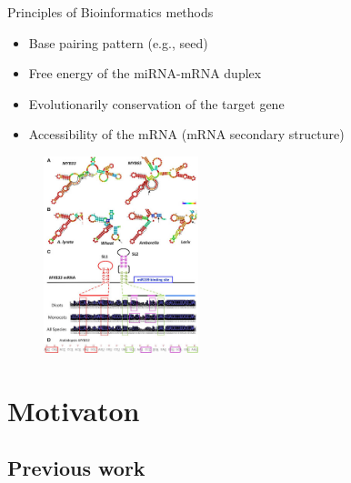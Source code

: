 \documentclass{beamer}
\begin{document}
\begin{frame}{Principles of Bioinformatics methods}
\begin{itemize}
\item Base pairing pattern (e.g., seed)
\item Free energy of the miRNA-mRNA duplex
\item Evolutionarily conservation of the target gene
\item Accessibility of the mRNA (mRNA secondary structure)
\end{itemize}
\begin{figure}[hb!]
	  \centering
    \includegraphics[width=0.4\textwidth]{images/mirna seed second.jpg}
\end{figure}
\end{frame}

\section{Motivaton}

\subsection{Previous work}
\end{document}
